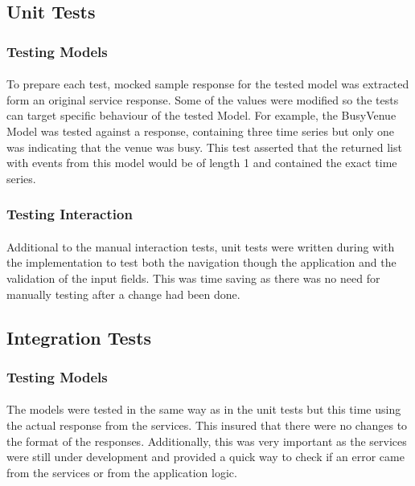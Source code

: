 \documentclass{l4proj}
\begin{document}
{\subsection{Unit Tests}

\subsubsection{Testing Models}
\paragraph{}
To prepare each test, mocked sample response for the tested model was extracted form an original service response. Some of the values were modified so the tests can target specific behaviour of the tested Model. For example, the BusyVenue Model was tested against a response, containing three time series but only one was indicating that the venue was busy. This test asserted that the returned list with events from this model would be of length 1 and contained the exact time series. 

\subsubsection{Testing Interaction}
\paragraph{}
Additional to the manual interaction tests, unit tests were written during with the implementation to test both the navigation though the application and the validation of the input fields. This was time saving as there was no need for manually testing after a change had been done.  

\subsection{Integration Tests}

\subsubsection{Testing Models}
\paragraph{}
The models were tested in the same way as in the unit tests but this time using the actual response from the services. This insured that there were no changes to the format of the responses. Additionally, this was very important as the services were still under development and provided a quick way to check if an error came from the services or from the application logic.   

}
\end{document}
